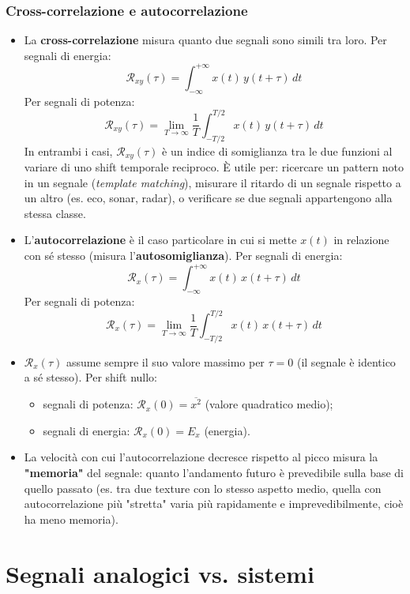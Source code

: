 \documentclass[12pt, a4paper]{article}
\begin{document}
\subsubsection{Cross-correlazione e autocorrelazione}
\begin{itemize}
    \item La \textbf{cross-correlazione} misura quanto due segnali sono simili tra loro. Per segnali di energia:
    $$\mathcal{R}_{xy}(\tau) = \int_{-\infty}^{+\infty} x(t)\,y(t+\tau)\,dt$$
    Per segnali di potenza:
    $$\mathcal{R}_{xy}(\tau) = \lim_{T\to\infty} \frac1T \int_{-T/2}^{T/2} x(t)\,y(t+\tau)\,dt$$
    In entrambi i casi, $\mathcal{R}_{xy}(\tau)$ è un indice di somiglianza tra le due funzioni al variare di uno shift temporale reciproco. È utile per: ricercare un pattern noto in un segnale (\textit{template matching}), misurare il ritardo di un segnale rispetto a un altro (es. eco, sonar, radar), o verificare se due segnali appartengono alla stessa classe.
    \item L'\textbf{autocorrelazione} è il caso particolare in cui si mette $x(t)$ in relazione con sé stesso (misura l'\textbf{autosomiglianza}). Per segnali di energia:
    $$\mathcal{R}_x(\tau) = \int_{-\infty}^{+\infty} x(t)\,x(t+\tau)\,dt$$
    Per segnali di potenza:
    $$\mathcal{R}_x(\tau) = \lim_{T\to\infty} \frac1T \int_{-T/2}^{T/2} x(t)\,x(t+\tau)\,dt$$
    \item $\mathcal{R}_x(\tau)$ assume sempre il suo valore massimo per $\tau=0$ (il segnale è identico a sé stesso). Per shift nullo:
    \begin{itemize}
        \item segnali di potenza: $\mathcal{R}_x(0) = \overline{x^2}$ (valore quadratico medio);
        \item segnali di energia: $\mathcal{R}_x(0) = E_x$ (energia).
    \end{itemize}
    \item La velocità con cui l'autocorrelazione decresce rispetto al picco misura la \textbf{"memoria"} del segnale: quanto l'andamento futuro è prevedibile sulla base di quello passato (es. tra due texture con lo stesso aspetto medio, quella con autocorrelazione più "stretta" varia più rapidamente e imprevedibilmente, cioè ha meno memoria).
\end{itemize}


\section{Segnali analogici vs. sistemi}
\end{document}
